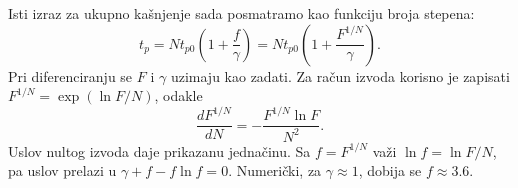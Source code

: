 Isti izraz za ukupno kašnjenje sada posmatramo kao funkciju broja stepena:
\[t_p=Nt_{p0}\left(1+\frac f\gamma\right)=Nt_{p0}\left(1+\frac{F^{1/N}}\gamma\right).
\]
Pri diferenciranju se $F$ i $\gamma$ uzimaju kao zadati. Za račun izvoda korisno je zapisati $F^{1/N}=\exp(\ln F/N)$, odakle
\[\frac{dF^{1/N}}{dN}=-\frac{F^{1/N}\ln F}{N^2}.
\]
Uslov nultog izvoda daje prikazanu jednačinu. Sa $f=F^{1/N}$ važi $\ln f=\ln F/N$, pa uslov prelazi u $\gamma+f-f\ln f=0$. Numerički, za $\gamma\approx1$, dobija se $f\approx3.6$.
